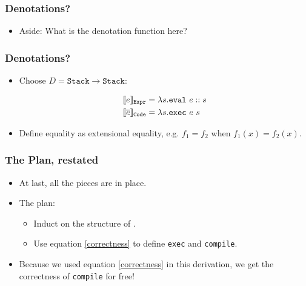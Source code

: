 \documentclass[usenames,dvipsnames]{beamer}
\newcommand{\denot}[2][]{\llbracket #2 \rrbracket_{#1}}
\begin{document}

\begin{frame}[fragile]
  \frametitle{Denotations?}

  \begin{itemize}
    \item Aside: What is the denotation function here?
  \end{itemize}
\end{frame}


\begin{frame}[fragile]
  \frametitle{Denotations?}

  \begin{itemize}
    \item Choose $D = \texttt{Stack} \rightarrow \texttt{Stack}$:

      \begin{align*}
        \denot[\Expr]{e} &= \lambda s . \texttt{eval}\ e :: s \\
        \denot[\texttt{Code}]{\overline{e}} &= \lambda s . \texttt{exec}\ e\ s
      \end{align*}

    \item Define equality as extensional equality, e.g. $f_1 = f_2$ when
      $f_1(x) = f_2(x)$.
  \end{itemize}
\end{frame}


\begin{frame}[fragile]
  \frametitle{The Plan, restated}

  \begin{itemize}
    \item At last, all the pieces are in place.

    \item The plan:
      \begin{itemize}
        \item Induct on the structure of \Expr{}.

        \item Use equation \ref{correctness} to define \texttt{exec} and
          \texttt{compile}.
      \end{itemize}

    \item Because we used equation \ref{correctness} in this derivation,
      we get the correctness of \texttt{compile} for free!
  \end{itemize}
\end{frame}
\end{document}
